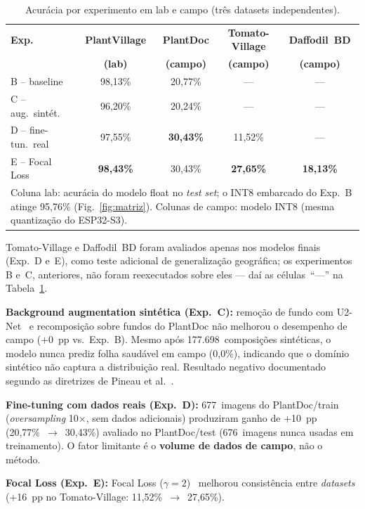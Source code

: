 \documentclass[12pt]{article}
\begin{document}
\begin{table}[ht]
\centering
\caption{Acurácia por experimento em lab e campo (três datasets independentes).}
\label{tab:gap}
\begin{tabular}{@{}lcccc@{}}
\toprule
\textbf{Exp.} & \textbf{PlantVillage} & \textbf{PlantDoc} & \textbf{Tomato-Village} & \textbf{Daffodil~BD} \\
              & \textbf{(lab)}        & \textbf{(campo)}  & \textbf{(campo)}        & \textbf{(campo)} \\
\midrule
B -- baseline        & 98,13\% & 20,77\% & ---              & --- \\
C -- aug.\ sintét.   & 96,20\% & 20,24\% & ---              & --- \\
D -- fine-tun.\ real & 97,55\% & \textbf{30,43\%} & 11,52\% & --- \\
E -- Focal Loss      & \textbf{98,43\%} & 30,43\% & \textbf{27,65\%} & \textbf{18,13\%} \\
\bottomrule
\multicolumn{5}{p{0.95\linewidth}}{\footnotesize Coluna lab: acurácia do modelo
float no \textit{test set}; o INT8 embarcado do Exp.~B atinge 95,76\%
(Fig.~\ref{fig:matriz}). Colunas de campo: modelo INT8 (mesma quantização do ESP32-S3).}
\end{tabular}
\end{table}

Tomato-Village e Daffodil~BD foram avaliados apenas nos modelos finais (Exp.~D e~E),
como teste adicional de generalização geográfica; os experimentos B e~C, anteriores,
não foram reexecutados sobre eles --- daí as células~``---'' na Tabela~\ref{tab:gap}.

\textbf{Background augmentation sintética (Exp.~C):} remoção de fundo com
U2-Net~\cite{qin2020} e recomposição sobre fundos do PlantDoc não melhorou o
desempenho de campo ($+$0~pp vs.\ Exp.~B). Mesmo após 177.698~composições
sintéticas, o modelo nunca prediz folha saudável em campo (0,0\%), indicando que
o domínio sintético não captura a distribuição real. Resultado negativo
documentado segundo as diretrizes de Pineau et al.~\cite{pineau2021}.

\textbf{Fine-tuning com dados reais (Exp.~D):} 677~imagens do PlantDoc/train
(\textit{oversampling} 10$\times$, sem dados adicionais) produziram ganho de
$+$10~pp (20,77\%~$\to$~30,43\%) avaliado no PlantDoc/test (676~imagens
nunca usadas em treinamento). O fator limitante é o \textbf{volume de dados de
campo}, não o método.

\textbf{Focal Loss (Exp.~E):} Focal Loss ($\gamma=2$)~\cite{lin2017} melhorou
consistência entre \textit{datasets} ($+$16~pp no Tomato-Village: 11,52\%~$\to$~27,65\%).
\end{document}
